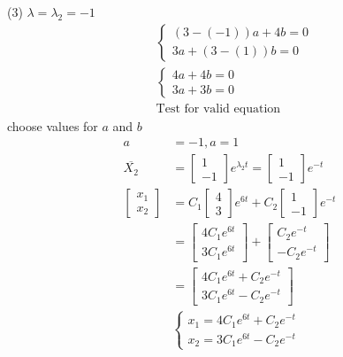 \documentclass[10pt, letterpaper]{article}
\begin{document}
(3) $\lambda =\lambda_2 =-1$\\
\begin{align*}
&\begin{cases}
	(3-(-1))a+4b=0\\
	3a+(3-(1))b=0
\end{cases}\\
&\begin{cases}
	4a+4b=0\\
	3a+3b=0
\end{cases}\\
&\text{Test for valid equation}
\end{align*}
choose values for $a$ and $b$\\
\begin{align*}
a &= -1, a=1\\
\overline{X_2} &= \begin{bmatrix}
	1\\
	-1
\end{bmatrix} e^{\lambda_2t} = \begin{bmatrix}
	1\\
	-1
\end{bmatrix} e^{-t}\\
\begin{bmatrix}
	x_1\\
	x_2
\end{bmatrix} &= C_1 \begin{bmatrix}
	4\\
	3
\end{bmatrix} e^{6t} + C_2 \begin{bmatrix}
	1\\
	-1
\end{bmatrix} e^{-t}\\
&= \begin{bmatrix}
	4C_1e^{6t}\\
	3C_1e^{6t}
\end{bmatrix} + \begin{bmatrix}
	C_2e^{-t}\\
	-C_2e^{-t}
\end{bmatrix}\\
&= \begin{bmatrix}
	4C_1e^{6t}+C_2e^{-t}\\
	3C_1e^{6t}-C_2e^{-t}
\end{bmatrix}\\
& \begin{cases}
	x_1 = 4C_1e^{6t}+C_2e^{-t}\\
	x_2 = 3C_1e^{6t}-C_2e^{-t}
\end{cases}
\end{align*}
\end{document}
